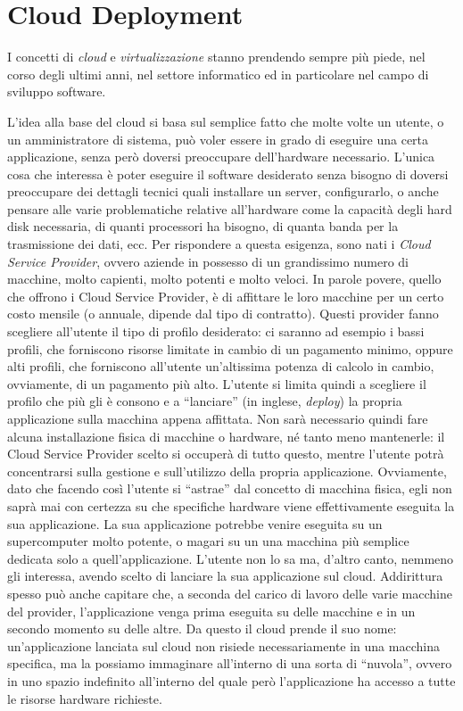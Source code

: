 \chapter{Cloud Deployment} \label{chap:cloud_deployment}

    I concetti di \textit{cloud} e \textit{virtualizzazione} stanno prendendo sempre più piede, nel corso degli ultimi anni, nel settore informatico ed in particolare nel campo di sviluppo software.
    
    L'idea alla base del cloud  si basa sul semplice fatto che molte volte un utente, o un amministratore di sistema, può voler essere in grado di eseguire una certa applicazione, senza però doversi preoccupare dell'hardware necessario. L'unica cosa che interessa è poter eseguire il software desiderato senza bisogno di doversi preoccupare dei dettagli tecnici quali installare un server, configurarlo, o anche pensare alle varie problematiche relative all'hardware come la capacità degli hard disk necessaria, di quanti processori ha bisogno, di quanta banda per la trasmissione dei dati, ecc. Per rispondere a questa esigenza, sono nati i \textit{Cloud Service Provider}, ovvero aziende in possesso di un grandissimo numero di macchine, molto capienti, molto potenti e molto veloci. In parole povere, quello che offrono i Cloud Service Provider, è di affittare le loro macchine per un certo costo mensile (o annuale, dipende dal tipo di contratto). Questi provider fanno scegliere all'utente il tipo di profilo desiderato: ci saranno ad esempio i bassi profili, che forniscono risorse limitate in cambio di un pagamento minimo, oppure alti profili, che forniscono all'utente un'altissima potenza di calcolo in cambio, ovviamente, di un pagamento più alto. L'utente si limita quindi a scegliere il profilo che più gli è consono e a ``lanciare'' (in inglese, \textit{deploy}) la propria applicazione sulla macchina appena affittata. Non sarà necessario quindi fare alcuna installazione fisica di macchine o hardware, né tanto meno mantenerle: il Cloud Service Provider scelto si occuperà di tutto questo, mentre l'utente potrà concentrarsi sulla gestione e sull'utilizzo della propria applicazione. Ovviamente, dato che facendo così l'utente si ``astrae'' dal concetto di macchina fisica, egli non saprà mai con certezza su che specifiche hardware viene effettivamente eseguita la sua applicazione. La sua applicazione potrebbe venire eseguita su un supercomputer molto potente, o magari su un una macchina più semplice dedicata solo a quell'applicazione. L'utente non lo sa ma, d'altro canto, nemmeno gli interessa, avendo scelto di lanciare la sua applicazione sul cloud. Addirittura spesso può anche capitare che, a seconda del carico di lavoro delle varie macchine del provider, l'applicazione venga prima eseguita su delle macchine e in un secondo momento su delle altre. Da questo il cloud prende il suo nome: un'applicazione lanciata sul cloud non risiede necessariamente in una macchina specifica, ma la possiamo immaginare all'interno di una sorta di ``nuvola'', ovvero in uno spazio indefinito all'interno del quale però l'applicazione ha accesso a tutte le risorse hardware richieste.
    
